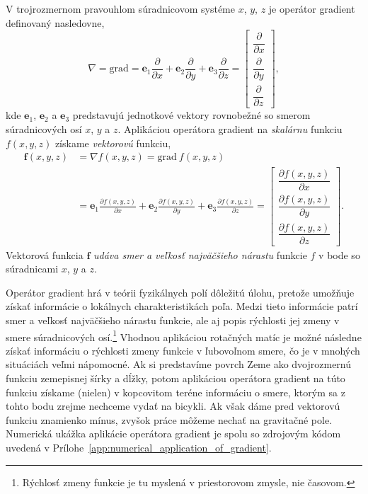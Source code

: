 \documentclass[a4paper, 12pt]{book}
\newcommand{\grad}{\mathrm{grad}}
\let\vec\mathbf
\begin{document}
V trojrozmernom pravouhlom súradnicovom systéme $x$, $y$, $z$ je operátor 
gradient definovaný nasledovne,
%
\begin{equation}
\label{eq:gradient}
\nabla = \grad = \vec e_1 \frac{\partial}{\partial x} + \vec e_2 
\frac{\partial}{\partial y} + \vec e_3 \frac{\partial}{\partial z} =
\begin{bmatrix}
\dfrac{\partial}{\partial x} \\[2ex]
\dfrac{\partial}{\partial y} \\[2ex]
\dfrac{\partial}{\partial z}
\end{bmatrix}
{,}
\end{equation}
%
kde $\vec e_1$, $\vec e_2$ a $\vec e_3$ predstavujú jednotkové vektory 
rovnobežné so smerom súradnicových osí $x$, $y$ a $z$.  Aplikáciou operátora 
gradient na \emph{skalárnu} funkciu $f(x, y, z)$ získame \emph{vektorovú} 
funkciu,
%
\begin{equation}
\begin{split}
\vec f(x, y, z) &= \nabla f(x, y, z) = \grad \ f(x, y, z)\\
%
&= \vec e_1 \frac{\partial f(x, y, z)}{\partial x} + \vec e_2 \frac{\partial 
f(x, y, z)}{\partial y} + \vec e_3 \frac{\partial f(x, y, z)}{\partial z} =
\begin{bmatrix}
\dfrac{\partial f(x, y, z)}{\partial x} \\[2ex]
\dfrac{\partial f(x, y, z)}{\partial y} \\[2ex]
\dfrac{\partial f(x, y, z)}{\partial z}
\end{bmatrix}
{.}
\end{split}
\end{equation}
%
Vektorová funkcia $\vec f$ \emph{udáva smer a veľkosť najväčšieho nárastu} 
funkcie $f$ v bode so súradnicami $x$, $y$ a $z$.

Operátor gradient hrá v teórii fyzikálnych polí dôležitú úlohu, pretože 
umožňuje získať informácie o lokálnych charakteristikách poľa.  Medzi tieto 
informácie patrí smer a veľkosť najväčšieho nárastu funkcie, ale aj popis 
rýchlosti jej zmeny v smere súradnicových osí.\footnote{Rýchlosť zmeny funkcie 
je tu myslená v priestorovom zmysle, nie časovom.}  Vhodnou aplikáciou 
rotačných matíc je možné následne získať informáciu o rýchlosti zmeny funkcie 
v ľubovoľnom smere, čo je v mnohých situáciách veľmi nápomocné.  Ak si 
predstavíme povrch Zeme ako dvojrozmernú funkciu zemepisnej šírky a dĺžky, 
potom aplikáciou operátora gradient na túto funkciu získame (nielen) 
v kopcovitom teréne informáciu o smere, ktorým sa z tohto bodu zrejme nechceme 
vydať na bicykli.  Ak však dáme pred vektorovú funkciu znamienko mínus, zvyšok 
práce môžeme nechať na gravitačné pole.  Numerická ukážka aplikácie operátora 
gradient je spolu so zdrojovým kódom uvedená 
v Prílohe~\ref{app:numerical_application_of_gradient}.
\end{document}
